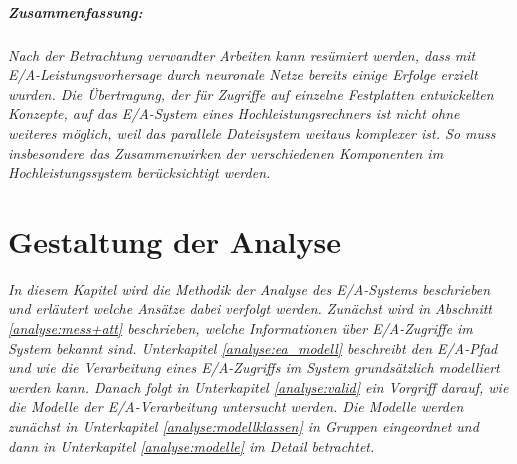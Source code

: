 \documentclass[
	twoside,
	12pt,
	a4paper,
	BCOR10mm,
	DIV14,
	listof=totoc,
	bibliography=totoc,
	headsepline
]{scrreprt}
\begin{document}
\paragraph{Zusammenfassung:}
\textit{
	Nach der Betrachtung verwandter Arbeiten kann resümiert werden, dass mit E/A-Leistungsvorhersage durch neuronale Netze bereits einige Erfolge erzielt wurden. Die Übertragung, der für Zugriffe auf einzelne Festplatten entwickelten Konzepte, auf das E/A-System eines Hochleistungsrechners ist nicht ohne weiteres möglich, weil das parallele Dateisystem weitaus komplexer ist. So muss insbesondere das Zusammenwirken der verschiedenen Komponenten im Hochleistungssystem berücksichtigt werden.
}

\chapter{Gestaltung der Analyse}
\label{gestaltung_der_analyse}
\textit{	
In diesem Kapitel wird die Methodik der Analyse des E/A-Systems beschrieben und erläutert welche Ansätze dabei verfolgt werden.
Zunächst wird in Abschnitt \ref{analyse:mess+att} beschrieben, welche Informationen über E/A-Zugriffe im System bekannt sind. Unterkapitel \ref{analyse:ea_modell} beschreibt den E/A-Pfad und wie die Verarbeitung eines E/A-Zugriffs im  System grundsätzlich modelliert werden kann.
Danach folgt in Unterkapitel \ref{analyse:valid} ein Vorgriff darauf, wie die Modelle der E/A-Verarbeitung untersucht werden. Die Modelle werden zunächst in Unterkapitel \ref{analyse:modellklassen} in Gruppen eingeordnet und dann in Unterkapitel \ref{analyse:modelle} im Detail betrachtet.
}
\bigskip
\end{document}
